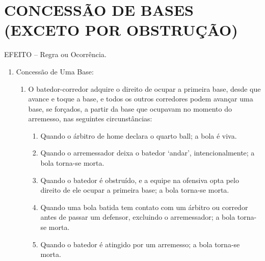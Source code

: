 \section{CONCESS\~AO DE BASES (EXCETO POR OBSTRU\c{C}\~AO)}

\begin{multicols}{2}

EFEITO -- Regra ou Ocorr\^encia. 


\begin{enumerate}[label=\alph*)]
	\item Concess\~ao de Uma Base: 
	\begin{enumerate}[label=\roman*.]
		\item O batedor-corredor adquire o direito de ocupar a primeira base, desde que avance e toque a base, e todos os outros corredores podem avan\c{c}ar uma base, se for\c{c}ados, a partir da base que ocupavam no momento do arremesso, nas seguintes circunst\^ancias: 
		\begin{enumerate}[label=\arabic*)]
			\item  Quando o \'arbitro de \gls{home} declara o quarto \gls{ball}; a bola \'e viva. 
			\item Quando o arremessador deixa o batedor ‘andar', intencionalmente; a bola torna-se morta. 
			\item Quando o batedor \'e obstru\'ido, e a equipe na ofensiva opta pelo direito de ele ocupar a primeira base; a bola torna-se morta. 
			\item Quando uma bola batida tem contato com um \'arbitro ou corredor antes de passar um defensor, excluindo o arremessador; a bola torna-se morta. 
			\item Quando o batedor \'e atingido por um arremesso; a bola torna-se morta. 
		\end{enumerate}
		

\end{enumerate}
\end{enumerate}
\end{multicols}
